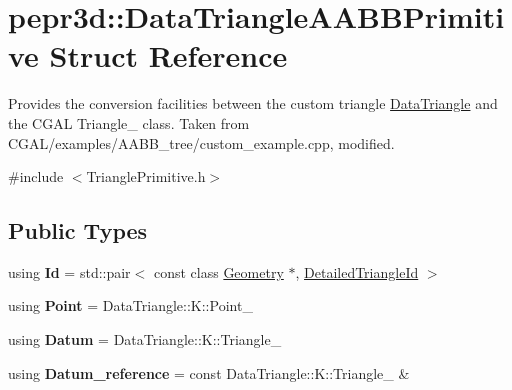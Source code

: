 \hypertarget{structpepr3d_1_1_data_triangle_a_a_b_b_primitive}{}\section{pepr3d\+::Data\+Triangle\+A\+A\+B\+B\+Primitive Struct Reference}
\label{structpepr3d_1_1_data_triangle_a_a_b_b_primitive}


Provides the conversion facilities between the custom triangle \mbox{\hyperlink{classpepr3d_1_1_data_triangle}{Data\+Triangle}} and the C\+G\+AL Triangle\+\_ class. Taken from C\+G\+A\+L/examples/\+A\+A\+B\+B\+\_\+tree/custom\+\_\+example.\+cpp, modified.  




{\ttfamily \#include $<$Triangle\+Primitive.\+h$>$}

\subsection*{Public Types}
\begin{DoxyCompactItemize}
\item 
\mbox{\label{structpepr3d_1_1_data_triangle_a_a_b_b_primitive_a43fbba8b479b4508f52b69e8bb5836ac}} 
using {\bfseries Id} = std\+::pair$<$ const class \mbox{\hyperlink{classpepr3d_1_1_geometry}{Geometry}} $\ast$, \mbox{\hyperlink{structpepr3d_1_1_detailed_triangle_id}{Detailed\+Triangle\+Id}} $>$
\item 
\mbox{\label{structpepr3d_1_1_data_triangle_a_a_b_b_primitive_ad5e320270958d6054c0128bd803dc6da}} 
using {\bfseries Point} = Data\+Triangle\+::\+K\+::\+Point\+\_
\item 
\mbox{\label{structpepr3d_1_1_data_triangle_a_a_b_b_primitive_ae1cb31e643a04da18a42a869625f249b}} 
using {\bfseries Datum} = Data\+Triangle\+::\+K\+::\+Triangle\+\_
\item 
\mbox{\label{structpepr3d_1_1_data_triangle_a_a_b_b_primitive_a94e6b53c64384b020566cd57a5a7ba21}} 
using {\bfseries Datum\+\_\+reference} = const Data\+Triangle\+::\+K\+::\+Triangle\+\_ \&
\end{DoxyCompactItemize}
